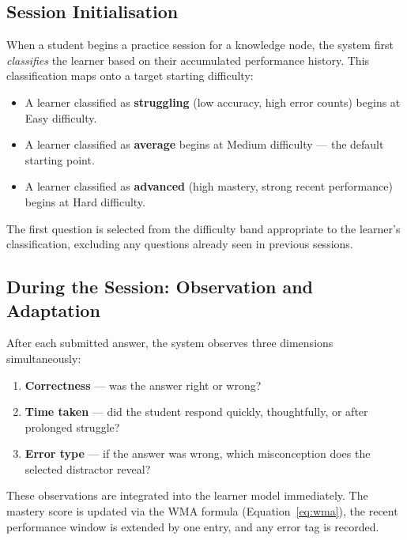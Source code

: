 \documentclass[12pt,a4paper]{article}
\begin{document}
\subsection{Session Initialisation}

When a student begins a practice session for a knowledge node, the system
first \emph{classifies} the learner based on their accumulated performance
history.  This classification maps onto a target starting difficulty:

\begin{itemize}[leftmargin=1.8em]
  \item A learner classified as \textbf{struggling} (low accuracy, high error
        counts) begins at Easy difficulty.
  \item A learner classified as \textbf{average} begins at Medium difficulty —
        the default starting point.
  \item A learner classified as \textbf{advanced} (high mastery, strong recent
        performance) begins at Hard difficulty.
\end{itemize}

The first question is selected from the difficulty band appropriate to the
learner's classification, excluding any questions already seen in previous
sessions.

\subsection{During the Session: Observation and Adaptation}

After each submitted answer, the system observes three dimensions
simultaneously:

\begin{enumerate}[leftmargin=2em, itemsep=4pt]
  \item \textbf{Correctness} — was the answer right or wrong?
  \item \textbf{Time taken} — did the student respond quickly, thoughtfully,
        or after prolonged struggle?
  \item \textbf{Error type} — if the answer was wrong, which misconception
        does the selected distractor reveal?
\end{enumerate}

These observations are integrated into the learner model immediately.  The
mastery score is updated via the WMA formula (Equation~\ref{eq:wma}), the
recent performance window is extended by one entry, and any error tag is
recorded.
\end{document}
